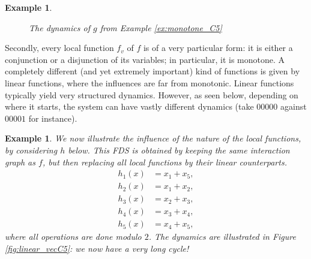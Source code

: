 \documentclass[a4paper, 11pt]{book}
\numberwithin{equation}{section}
\theoremstyle{plain}
\newtheorem{example}	[equation]	{Example}
\renewcommand{\(}{\ldbrack}
\renewcommand{\)}{\rdbrack}
\begin{document}
\begin{example}
\begin{figure}
\caption{The dynamics of $g$ from Example \ref{ex:monotone_C5}} \label{fig:monotone_C5}
\end{figure}	
\end{example}


Secondly, every local function $f_v$ of $f$ is of a very particular form: it is either a conjunction or a disjunction of its variables; in particular, it is monotone. A completely different (and yet extremely important) kind of functions is given by linear functions, where the influences are far from monotonic. Linear functions typically yield very structured dynamics. However, as seen below, depending on where it starts, the system can have vastly different dynamics (take $00000$ against $00001$ for instance).




\begin{example} \label{ex:linear_vecC5}
We now illustrate the influence of the nature of the local functions, by considering $h$ below. This FDS is obtained by keeping the same interaction graph as $f$, but then replacing all local functions by their linear counterparts.
\begin{align*}
	h_1(x) &=  x_1 + x_5,\\
	h_2(x) &=  x_1 + x_2,\\
	h_3(x) &=  x_2 + x_3,\\
	h_4(x) &=  x_3 + x_4,\\
	h_5(x) &=  x_4 + x_5,
\end{align*}
where all operations are done modulo $2$. The dynamics are illustrated in Figure \ref{fig:linear_vecC5}: we now have a very long cycle!
\end{example}
\end{document}
